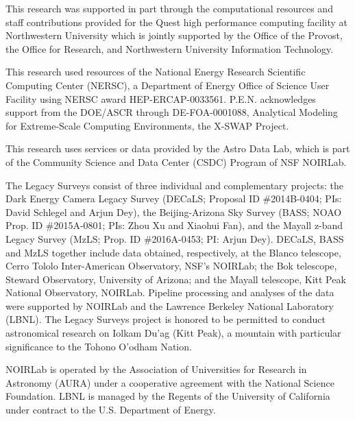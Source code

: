 \documentclass[twocolumn,tighten]{aastex631}
\begin{document}
\begin{CJK*}{UTF8}{gbsn}
This research was supported in part through the computational resources and staff contributions provided for the Quest high performance computing facility at Northwestern University which is jointly supported by the Office of the Provost, the Office for Research, and Northwestern University Information Technology. 

This research used resources of the National Energy Research Scientific Computing Center (NERSC), a Department of Energy Office of Science User Facility using NERSC award HEP-ERCAP-0033561. P.E.N. acknowledges support from the DOE/ASCR
through DE-FOA-0001088, Analytical Modeling for Extreme-Scale Computing Environments, the X-SWAP Project. 

This research uses services or data provided by the Astro Data Lab, which is part of the Community Science and Data Center (CSDC) Program of NSF NOIRLab. 


The Legacy Surveys consist of three individual and complementary projects: the Dark Energy Camera Legacy Survey (DECaLS; Proposal ID \#2014B-0404; PIs: David Schlegel and Arjun Dey), the Beijing-Arizona Sky Survey (BASS; NOAO Prop. ID \#2015A-0801; PIs: Zhou Xu and Xiaohui Fan), and the Mayall z-band Legacy Survey (MzLS; Prop. ID \#2016A-0453; PI: Arjun Dey). DECaLS, BASS and MzLS together include data obtained, respectively, at the Blanco telescope, Cerro Tololo Inter-American Observatory, NSF's NOIRLab; the Bok telescope, Steward Observatory, University of Arizona; and the Mayall telescope, Kitt Peak National Observatory, NOIRLab. Pipeline processing and analyses of the data were supported by NOIRLab and the Lawrence Berkeley National Laboratory (LBNL). The Legacy Surveys project is honored to be permitted to conduct astronomical research on Iolkam Du'ag (Kitt Peak), a mountain with particular significance to the Tohono O'odham Nation.

NOIRLab is operated by the Association of Universities for Research in Astronomy (AURA) under a cooperative agreement with the National Science Foundation. LBNL is managed by the Regents of the University of California under contract to the U.S. Department of Energy.


\end{CJK*}
\end{document}
